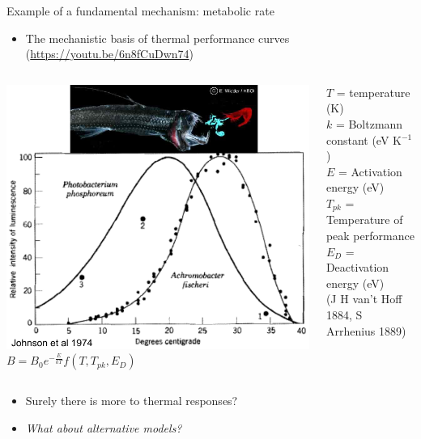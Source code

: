 \documentclass[xcolor=x11names,compress]{beamer}
\renewcommand{\(}{\begin{columns}}
\renewcommand{\)}{\end{columns}}
\newcommand{\<}[1]{\begin{column}{#1}}
\renewcommand{\>}{\end{column}}
\begin{document}
\begin{frame}{Example of a fundamental mechanism: metabolic rate}

	\begin{itemize}
		\item The mechanistic basis of thermal performance curves (\url{https://youtu.be/6n8fCuDwn74}) 
	\end{itemize}

\begin{columns}[c]
    \pause
      \includegraphics[width=\textwidth]{graphics/Photobacterium.pdf}
  \pause
  \scriptsize
    $B = B_0 \boxed {e^{-\frac{E}{kT}}}f(T,T_{pk},E_D)$\\
    \vspace{10pt}
    \raggedright{$T$ = temperature (K)\\
     $k$ = Boltzmann constant (eV K$^{-1}$)}\\
     $E$ = Activation energy (eV)\\
     $T_{pk}$ = Temperature of peak performance\\
	 $E_D$ = Deactivation energy (eV)\\
	 
    {\tiny (J H van't Hoff 1884, S Arrhenius 1889)}
\end{columns}

\begin{itemize}\setlength{\itemindent}{0em}
  \pause
  \item Surely there is more to thermal responses?
  \item \textit{What about alternative models?}\\


\end{itemize}
\end{frame}
\end{document}
